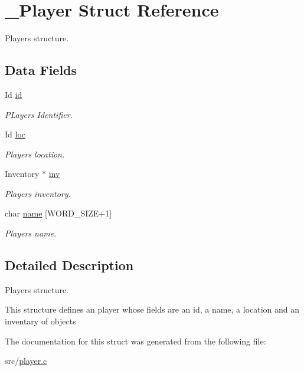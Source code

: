 \hypertarget{struct__Player}{}\section{\+\_\+\+Player Struct Reference}
\label{struct__Player}


Player\textquotesingle{}s structure.  


\subsection*{Data Fields}
\begin{DoxyCompactItemize}
\item 
\mbox{\label{struct__Player_a60d635cd063816a9c1bd873f4868bb90}} 
Id \hyperlink{struct__Player_a60d635cd063816a9c1bd873f4868bb90}{id}
\begin{DoxyCompactList}\small\item\em P\+Layer\textquotesingle{}s Identifier. \end{DoxyCompactList}\item 
\mbox{\label{struct__Player_a40f39335ccf0d2de882b7588f1917e58}} 
Id \hyperlink{struct__Player_a40f39335ccf0d2de882b7588f1917e58}{loc}
\begin{DoxyCompactList}\small\item\em Player\textquotesingle{}s location. \end{DoxyCompactList}\item 
\mbox{\label{struct__Player_aaaeeb03326c37ce62c333c2b94fde23c}} 
Inventory $\ast$ \hyperlink{struct__Player_aaaeeb03326c37ce62c333c2b94fde23c}{inv}
\begin{DoxyCompactList}\small\item\em Player\textquotesingle{}s inventory. \end{DoxyCompactList}\item 
\mbox{\label{struct__Player_ac89715f913cc607b75eb7236765c41f5}} 
char \hyperlink{struct__Player_ac89715f913cc607b75eb7236765c41f5}{name} \mbox{[}W\+O\+R\+D\+\_\+\+S\+I\+ZE+1\mbox{]}
\begin{DoxyCompactList}\small\item\em Player\textquotesingle{}s name. \end{DoxyCompactList}\end{DoxyCompactItemize}


\subsection{Detailed Description}
Player\textquotesingle{}s structure. 

This structure defines an player whose fields are an id, a name, a location and an inventary of objects 

The documentation for this struct was generated from the following file\+:\begin{DoxyCompactItemize}
\item 
src/\hyperlink{player_8c}{player.\+c}\end{DoxyCompactItemize}
